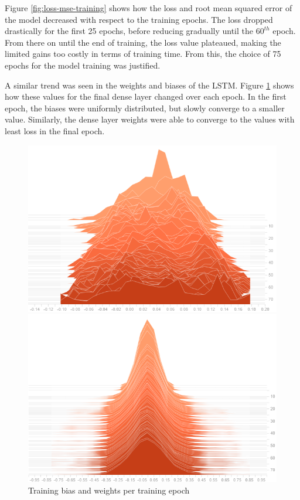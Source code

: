 Figure \ref{fig:loss-mse-training} shows how the loss and root mean squared error of the model decreased with respect to the training epochs. The loss dropped drastically for the first 25 epochs, before reducing gradually until the $60^{th}$ epoch. From there on until the end of training, the loss value plateaued, making the limited gains too costly in terms of training time. From this, the choice of 75 epochs for the model training was justified.\par

A similar trend was seen in the weights and biases of the LSTM. Figure \ref{fig:bias-weight-training} shows how these values for the final dense layer changed over each epoch. In the first epoch, the biases were uniformly distributed, but slowly converge to a smaller value. Similarly, the dense layer weights were able to converge to the values with least loss in the final epoch.\par

\begin{figure}[htb]
    \centering
    \caption{Training bias and weights per training epoch}
    \label{fig:bias-weight-training}
    \begin{minipage}{0.6\linewidth}
        \includegraphics[width=1.0\linewidth]{Figures/LSTM-Bias.png}
    \end{minipage}\hfill
    \begin{minipage}{0.6\linewidth}
        \includegraphics[width=1.0\linewidth]{Figures/LSTM-Weights.png}
    \end{minipage}
\end{figure}

